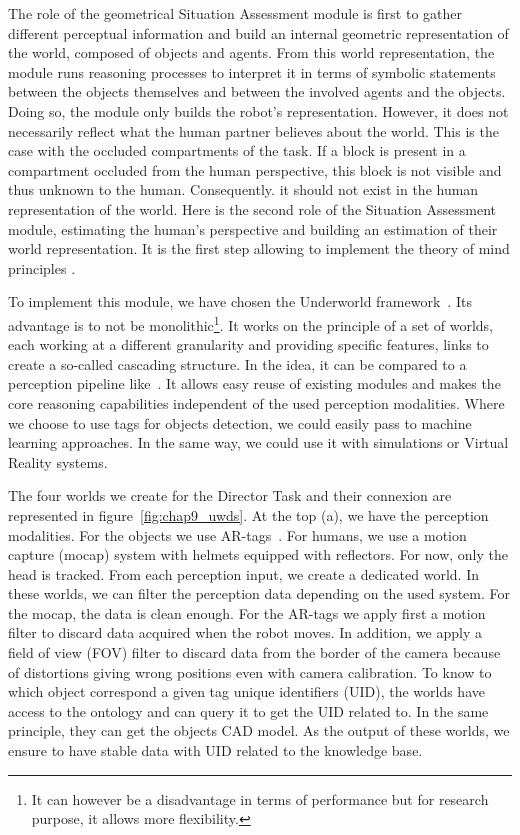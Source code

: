 The role of the geometrical Situation Assessment module is first to gather different perceptual information and build an internal geometric representation of the world, composed of objects and agents. From this world representation, the module runs reasoning processes to interpret it in terms of symbolic statements between the objects themselves and between the involved agents and the objects. Doing so, the module only builds the robot's representation. However, it does not necessarily reflect what the human partner believes about the world. This is the case with the occluded compartments of the task. If a block is present in a compartment occluded from the human perspective, this block is not visible and thus unknown to the human. Consequently. it should not exist in the human representation of the world. Here is the second role of the Situation Assessment module, estimating the human's perspective and building an estimation of their world representation. It is the first step allowing to implement the theory of mind principles \cite{baron_1985_does}.

To implement this module, we have chosen the Underworld framework~\cite{lemaignan_2018_underworlds}. Its advantage is to not be monolithic\footnote{It can however be a disadvantage in terms of performance but for research purpose, it allows more flexibility.}. It works on the principle of a set of worlds, each working at a different granularity and providing specific features, links to create a so-called cascading structure. In the idea, it can be compared to a perception pipeline like~\cite{beetz_2015_robosherlock}. It allows easy reuse of existing modules and makes the core reasoning capabilities independent of the used perception modalities. Where we choose to use tags for objects detection, we could easily pass to machine learning approaches. In the same way, we could use it with simulations or Virtual Reality systems.

The four worlds we create for the Director Task and their connexion are represented in figure~\ref{fig:chap9_uwds}. At the top (a), we have the perception modalities. For the objects we use AR-tags~\cite{fiala_2005_artag}. For humans, we use a motion capture (mocap) system with helmets equipped with reflectors. For now, only the head is tracked. From each perception input, we create a dedicated world. In these worlds, we can filter the perception data depending on the used system. For the mocap, the data is clean enough. For the AR-tags we apply first a motion filter to discard data acquired when the robot moves. In addition, we apply a field of view (FOV) filter to discard data from the border of the camera because of distortions giving wrong positions even with camera calibration. To know to which object correspond a given tag unique identifiers (UID), the worlds have access to the ontology and can query it to get the UID related to. In the same principle, they can get the objects CAD model. As the output of these worlds, we ensure to have stable data with UID related to the knowledge base.


